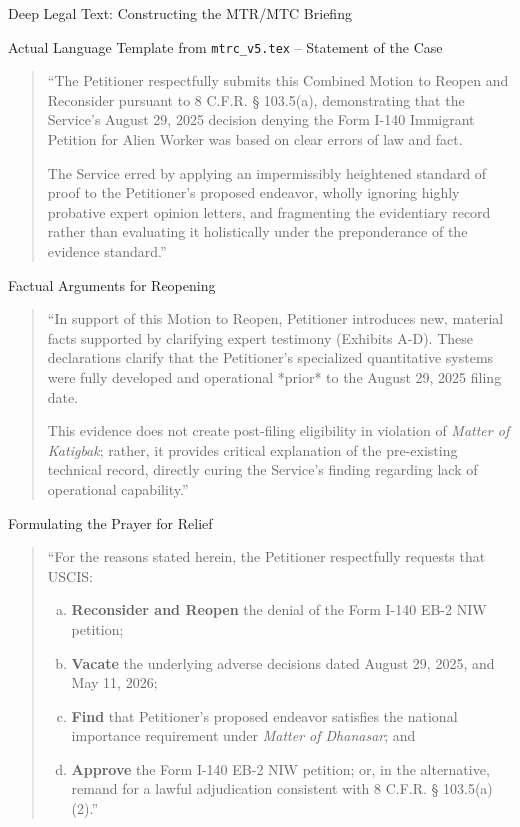 \documentclass[11pt]{beamer}
\begin{document}
	\begin{frame}[allowframebreaks]{Deep Legal Text: Constructing the MTR/MTC Briefing}
		\scriptsize
		\begin{block}{Actual Language Template from \texttt{mtrc\_v5.tex} -- Statement of the Case}
			\begin{quote}
				``The Petitioner respectfully submits this Combined Motion to Reopen and Reconsider pursuant to 8 C.F.R. § 103.5(a), demonstrating that the Service's August 29, 2025 decision denying the Form I-140 Immigrant Petition for Alien Worker was based on clear errors of law and fact. 
				
				The Service erred by applying an impermissibly heightened standard of proof to the Petitioner's proposed endeavor, wholly ignoring highly probative expert opinion letters, and fragmenting the evidentiary record rather than evaluating it holistically under the preponderance of the evidence standard.''
			\end{quote}
		\end{block}
		\framebreak
		\begin{block}{Factual Arguments for Reopening}
			\begin{quote}
				``In support of this Motion to Reopen, Petitioner introduces new, material facts supported by clarifying expert testimony (Exhibits A-D). These declarations clarify that the Petitioner's specialized quantitative systems were fully developed and operational *prior* to the August 29, 2025 filing date. 
				
				This evidence does not create post-filing eligibility in violation of \textit{Matter of Katigbak}; rather, it provides critical explanation of the pre-existing technical record, directly curing the Service’s finding regarding lack of operational capability.''
			\end{quote}
		\end{block}
		\framebreak
		\begin{block}{Formulating the Prayer for Relief}
			\begin{quote}
				``For the reasons stated herein, the Petitioner respectfully requests that USCIS:
				\begin{enumerate}[(a)]
					\item \textbf{Reconsider and Reopen} the denial of the Form I-140 EB-2 NIW petition;
					\item \textbf{Vacate} the underlying adverse decisions dated August 29, 2025, and May 11, 2026;
					\item \textbf{Find} that Petitioner’s proposed endeavor satisfies the national importance requirement under \textit{Matter of Dhanasar}; and
					\item \textbf{Approve} the Form I-140 EB-2 NIW petition; or, in the alternative, remand for a lawful adjudication consistent with 8 C.F.R. § 103.5(a)(2).''
				\end{enumerate}
			\end{quote}
		\end{block}
	\end{frame}
	
\end{document}
